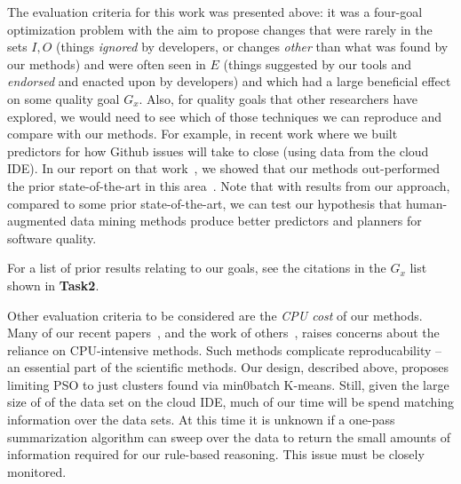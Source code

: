 The evaluation criteria for this work was presented above: it was a four-goal optimization problem with the aim
to propose changes that were rarely in the sets $I,O$ (things {\em ignored} by developers, or changes {\em other} than
what was found by our methods) and were often seen in $E$ (things suggested by our tools and {\em endorsed} and enacted
upon by developers) and which had a large beneficial effect on some quality goal $G_x$.
Also, for quality goals that other researchers have explored, we would need to see which of those techniques
we can reproduce and compare with our methods. For example, in recent work where we built predictors for how Github issues
will take to close (using data from the cloud IDE). In our report on that work~\cite{rees2017better}, we showed
that our methods out-performed the prior state-of-the-art in this area~\cite{Kikas:2016}.
Note that with results from our approach, compared to some prior state-of-the-art, we can test our hypothesis that human-augmented data mining methods produce better predictors and planners for software quality. 
\bi
\item For a list of prior results relating to our goals, see the citations in the $G_x$ list shown in {\bf Task2}.
\ei

Other evaluation criteria to be considered are the {\em CPU cost} of our methods.
Many of our recent papers~\cite{chen2017beyond,fu2017easy,nair2017faster,mathew2017shorter,nair2017flash,chen2017riot}, 
and the work of others~\cite{Fisher:2012}, raises concerns about the reliance on CPU-intensive methods.
Such methods complicate reproducability -- an essential part of the scientific methods. Our design, described above, proposes
limiting PSO to just clusters found via min0batch K-means.
Still,  given the large size of of the data set on
the cloud IDE, much of our time will be spend matching information over
the data sets. At this time it is unknown if a one-pass summarization
algorithm can sweep over the data to return the small amounts of information
required for our rule-based reasoning. This issue  must be closely monitored.

